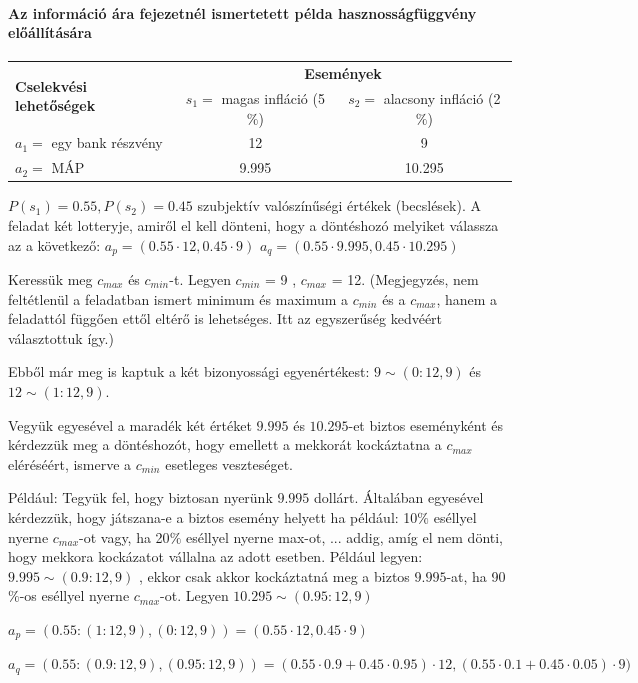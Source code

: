 \documentclass[a4paper,12pt]{article}
\begin{document}
\paragraph{Az információ ára fejezetnél ismertetett példa hasznosságfüggvény előállítására}

\begin{center}
\begin{tabular}{l|c|c}
\multirow{2}{*}{\bf Cselekvési lehetőségek } &  \multicolumn{2}{c}{ \bf Események }\\
 & $s_1=$ magas infláció (5$\%$) & $s_2=$ alacsony infláció (2$\%$) \\
\hline
  $a_1=$ egy bank részvény & 12 & 9 \\
  $a_2=$ MÁP & 9.995 & 10.295 \\
\end{tabular}
\end{center}
$P(s_1) = 0.55 , P(s_2) = 0.45$ szubjektív valószínűségi értékek (becslések).
A feladat két lotteryje, amiről el kell dönteni, hogy a döntéshozó melyiket válassza az a következő:
$a_p = ( 0.55 \cdot 12 , 0.45 \cdot 9 ) $
$a_q = ( 0.55 \cdot 9.995 , 0.45 \cdot 10.295 ) $

Keressük meg $c_{max}$ és $c_{min}$-t. Legyen $c_{min}$ = 9 , $c_{max}$ = 12. (Megjegyzés, nem feltétlenül a feladatban ismert minimum és maximum a $c_{min}$ és a $c_{max}$, hanem a feladattól függően ettől eltérő is lehetséges. Itt az egyszerűség kedvéért választottuk így.)

Ebből már meg is kaptuk a két bizonyossági egyenértékest: $9 \sim (0: 12,9)$ és $12 \sim (1: 12,9)$.

Vegyük egyesével a maradék két értéket $9.995$ és $10.295$-et biztos eseményként és kérdezzük meg a döntéshozót, hogy emellett a mekkorát kockáztatna a $c_{max}$ eléréséért, ismerve a $c_{min}$ esetleges veszteséget.

Például: Tegyük fel, hogy biztosan nyerünk $9.995$ dollárt. Általában egyesével kérdezzük, hogy játszana-e a biztos esemény helyett ha például: 10$\%$ eséllyel nyerne $c_{max}$-ot vagy, ha 20$\%$ eséllyel nyerne max-ot, ... addig, amíg el nem dönti, hogy mekkora kockázatot vállalna az adott esetben. Például legyen: $9.995 \sim (0.9: 12,9)$ , ekkor csak akkor kockáztatná meg a biztos $9.995$-at, ha 90$\%$-os eséllyel nyerne $c_{max}$-ot. Legyen $10.295 \sim (0.95: 12,9)$ 

$a_p = (0.55:(1: 12,9),(0: 12,9)) = (0.55 \cdot 12, 0.45 \cdot 9)$

$a_q = (0.55:(0.9: 12,9),(0.95: 12,9)) = (0.55 \cdot 0.9 + 0.45 \cdot 0.95) \cdot 12, (0.55 \cdot 0.1 + 0.45 \cdot 0.05) \cdot 9)$
\end{document}
